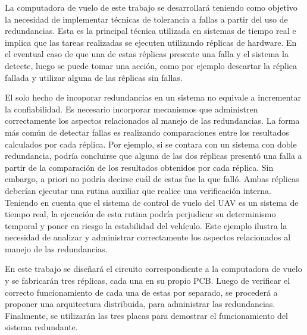 La computadora de vuelo de este trabajo se desarrollará teniendo como objetivo la necesidad de implementar técnicas de tolerancia a fallas a partir del uso de redundancias. Esta es la principal técnica utilizada en sistemas de tiempo real \cite{nelson1990fault} e implica que las tareas realizadas se ejecuten utilizando réplicas de hardware. En el eventual caso de que una de estas réplicas presente una falla y el sistema la detecte, luego se puede tomar una acción, como por ejemplo descartar la réplica fallada y utilizar alguna de las réplicas sin fallas. 

El solo hecho de incoporar redundancias en un sistema no equivale a incrementar la confiabilidad. Es necesario incorporar mecanismos que administren correctamente los aspectos relacionados al manejo de las redundancias. La forma más común de detectar fallas es realizando comparaciones entre los resultados calculados por cada réplica. Por ejemplo, si se contara con un sistema con doble redundancia, podría concluirse que alguna de las dos réplicas presentó una falla a partir de la comparación de los resultados obtenidos por cada réplica. Sin embargo, a priori no podría decirse cuál de estas fue la que falló. Ambas réplicas deberían ejecutar una rutina auxiliar que realice una verificación interna. Teniendo en cuenta que el sistema de control de vuelo del UAV es un sistema de tiempo real, la ejecución de esta rutina podría perjudicar su determinismo temporal y poner en riesgo la estabilidad del vehículo. Este ejemplo ilustra la necesidad de analizar y administrar correctamente los aspectos relacionados al manejo de las redundancias.

En este trabajo se diseñará el circuito correspondiente a la computadora de vuelo y se fabricarán tres réplicas, cada una en su propio PCB. Luego de verificar el correcto funcionamiento de cada una de estas por separado, se procederá a proponer una arquitectura distribuida, para administrar las redundancias. Finalmente, se utilizarán las tres placas para demostrar el funcionamiento del sistema redundante.



